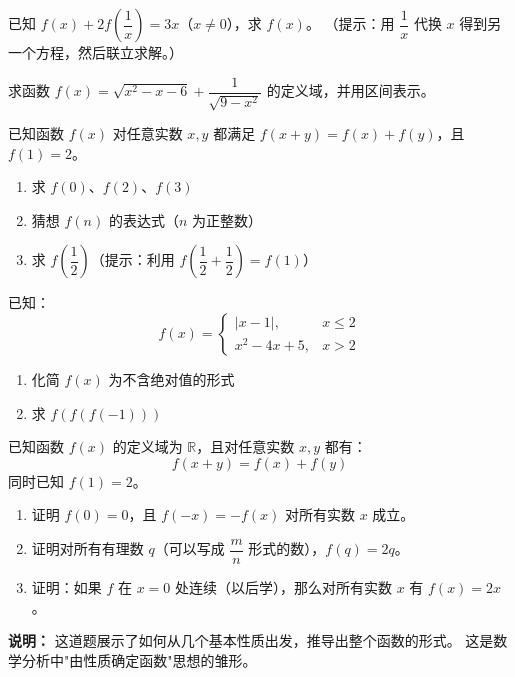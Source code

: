 \begin{exercise}[5]
已知 \(f(x) + 2f\left(\dfrac{1}{x}\right) = 3x\)（\(x \neq 0\)），求 \(f(x)\)。
（提示：用 \(\dfrac{1}{x}\) 代换 \(x\) 得到另一个方程，然后联立求解。）
\end{exercise}


\begin{exercise}[6]
求函数 \(f(x) = \sqrt{x^2 - x - 6} + \dfrac{1}{\sqrt{9 - x^2}}\) 的定义域，并用区间表示。
\end{exercise}

\begin{exercise}[6]
已知函数 \(f(x)\) 对任意实数 \(x, y\) 都满足 \(f(x + y) = f(x) + f(y)\)，且 \(f(1) = 2\)。
\begin{enumerate}
  \item[(1)] 求 \(f(0)\)、\(f(2)\)、\(f(3)\)
  \item[(2)] 猜想 \(f(n)\) 的表达式（\(n\) 为正整数）
  \item[(3)] 求 \(f\left(\dfrac{1}{2}\right)\)（提示：利用 \(f\left(\dfrac{1}{2} + \dfrac{1}{2}\right) = f(1)\)）
\end{enumerate}
\end{exercise}

\begin{exercise}[6]
已知：
\[
f(x) =
\begin{cases}
|x - 1|,  & x \le 2 \\
x^2 - 4x + 5, & x > 2
\end{cases}
\]
\begin{enumerate}
  \item[(1)] 化简 \(f(x)\) 为不含绝对值的形式
  \item[(2)] 求 \(f(f(f(-1)))\)
\end{enumerate}
\end{exercise}


\begin{exercise}[7]
已知函数 \(f(x)\) 的定义域为 \(\mathbb{R}\)，且对任意实数 \(x, y\) 都有：
\[
f(x + y) = f(x) + f(y)
\]
同时已知 \(f(1) = 2\)。

\begin{enumerate}
  \item[(1)] 证明 \(f(0) = 0\)，且 \(f(-x) = -f(x)\) 对所有实数 \(x\) 成立。
  \item[(2)] 证明对所有有理数 \(q\)（可以写成 \(\dfrac{m}{n}\) 形式的数），\(f(q) = 2q\)。
  \item[(3)] 证明：如果 \(f\) 在 \(x = 0\) 处连续（以后学），那么对所有实数 \(x\) 有 \(f(x) = 2x\)。
\end{enumerate}

\textbf{说明：} 这道题展示了如何从几个基本性质出发，推导出整个函数的形式。
这是数学分析中"由性质确定函数"思想的雏形。
\end{exercise}


